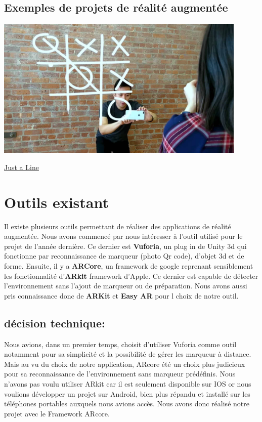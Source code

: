 \documentclass[12pt]{article}
\begin{document}
\subsection{Exemples de projets de réalité augmentée}
	\includegraphics[width=0.9\textwidth]{justLine.png}
	\begin{center}
	\href{https://play.google.com/store/apps/details?id=com.arexperiments.justaline&hl=fr}{Just a Line}
	\end{center}

\section{Outils existant}
\par
Il existe plusieurs outils permettant de réaliser des applications de réalité augmentée. Nous avons commencé par nous intéresser à l’outil utilisé pour le projet de l’année dernière.
 Ce dernier est \textbf{Vuforia}, un plug in de Unity 3d qui fonctionne par reconnaissance de marqueur (photo Qr code), d’objet 3d et de forme. Ensuite, il y a \textbf{ARCore}, un framework de google
  reprenant sensiblement les fonctionnalité d'\textbf{ARkit} framework d’Apple. Ce dernier est capable de détecter l'environnement sans l’ajout de marqueur ou de préparation. Nous avons aussi
 pris connaissance donc de \textbf{ARKit} et \textbf{Easy AR} pour l choix de notre outil.

\subsection{décision technique:}
\par
Nous avions, dans un premier temps, choisit d’utiliser Vuforia comme outil notamment pour sa simplicité et la possibilité de gérer les marqueur à distance. Mais au vu du choix de notre application, ARcore été un choix plus judicieux pour sa reconnaissance de l'environnement sans marqueur prédéfinis. Nous n’avons pas voulu utiliser ARkit car il est seulement disponible sur IOS or nous voulions développer un projet sur Android, bien plus répandu et installé sur les téléphones portables auxquels nous avions accès. Nous avons donc réalisé notre projet avec le Framework ARcore.
\end{document}

